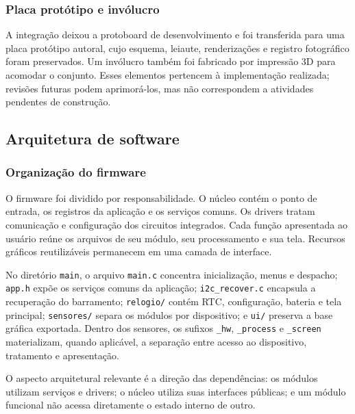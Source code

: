 \documentclass[a4paper,12pt]{article}
\begin{document}
\subsubsection{Placa prot\'otipo e inv\'olucro}


A integra\c{c}\~ao deixou a protoboard de desenvolvimento e foi transferida para uma placa prot\'otipo autoral, cujo esquema, leiaute, renderiza\c{c}\~oes e registro fotogr\'afico foram preservados. Um inv\'olucro tamb\'em foi fabricado por impress\~ao 3D para acomodar o conjunto. Esses elementos pertencem \`a implementa\c{c}\~ao realizada; revis\~oes futuras podem aprimor\'a-los, mas n\~ao correspondem a atividades pendentes de constru\c{c}\~ao.


\subsection{Arquitetura de software}


\subsubsection{Organiza\c{c}\~ao do firmware}


O firmware foi dividido por responsabilidade. O n\'ucleo cont\'em o ponto de entrada, os registros da aplica\c{c}\~ao e os servi\c{c}os comuns. Os drivers tratam comunica\c{c}\~ao e configura\c{c}\~ao dos circuitos integrados. Cada fun\c{c}\~ao apresentada ao usu\'ario re\'une os arquivos de seu m\'odulo, seu processamento e sua tela. Recursos gr\'aficos reutiliz\'aveis permanecem em uma camada de interface.


No diret\'orio \texttt{main}, o arquivo \texttt{main.c} concentra inicializa\c{c}\~ao, menus e despacho; \texttt{app.h} exp\~oe os servi\c{c}os comuns da aplica\c{c}\~ao; \texttt{i2c\_recover.c} encapsula a recupera\c{c}\~ao do barramento; \texttt{relogio/} cont\'em RTC, configura\c{c}\~ao, bateria e tela principal; \texttt{sensores/} separa os m\'odulos por dispositivo; e \texttt{ui/} preserva a base gr\'afica exportada. Dentro dos sensores, os sufixos \texttt{\_hw}, \texttt{\_process} e \texttt{\_screen} materializam, quando aplic\'avel, a separa\c{c}\~ao entre acesso ao dispositivo, tratamento e apresenta\c{c}\~ao.


O aspecto arquitetural relevante \'e a dire\c{c}\~ao das depend\^encias: os m\'odulos utilizam servi\c{c}os e drivers; o n\'ucleo utiliza suas interfaces p\'ublicas; e um m\'odulo funcional n\~ao acessa diretamente o estado interno de outro.
\end{document}
